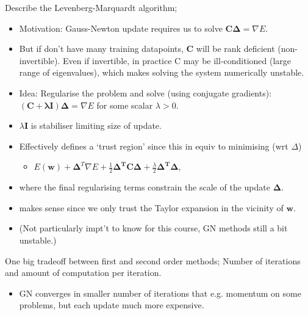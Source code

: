 \documentclass{article}
\begin{document}
Describe the Levenberg-Marquardt algorithm; \begin{itemize} \item Motivation: Gauss-Newton update requires us to solve $\mathbf{C\Delta} = \nabla E$.  \item But if don't have many training datapoints, $\mathbf{C}$ will be rank deficient (non-invertible). Even if invertible, in practice C may be ill-conditioned (large range of eigenvalues), which makes solving the system numerically unstable.  \item Idea: Regularise the problem and solve (using conjugate gradients): $(\mathbf{C+\lambda I})\mathbf{\Delta}=\nabla E$ for some scalar $\lambda > 0$.  \item $\lambda \mathbf{I}$ is stabiliser limiting size of update.  \item Effectively defines a `trust region' since this in equiv to minimising (wrt $\Delta$) \begin{itemize} \item $E(\mathbf{w}) + \mathbf{\Delta}^T\nabla E + \frac{1}{2}\mathbf{\Delta^TC\Delta} + \frac{\lambda}{2}\mathbf{\Delta^T\Delta}$, \end{itemize} \item where the final regularising terms constrain the scale of the update $\mathbf{\Delta}$.  \item makes sense since we only trust the Taylor expansion in the vicinity of $\mathbf{w}$.  \item (Not particularly impt't to know for this course, GN methods still a bit unstable.) \end{itemize}

One big tradeoff between first and second order methods; Number of iterations and amount of computation per iteration. \begin{itemize} \item GN converges in smaller number of iterations that e.g. momentum on some problems, but each update much more expensive.  \end{itemize}
\end{document}
